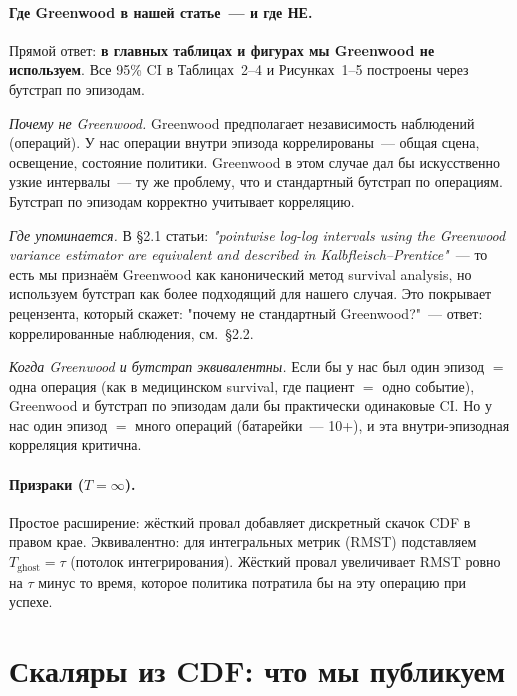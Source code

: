 \documentclass[11pt]{article}
\begin{document}
\paragraph{Где Greenwood в нашей статье~--- и где НЕ.} Прямой ответ: \textbf{в главных таблицах и фигурах мы Greenwood не используем}. Все 95\% CI в Таблицах~2--4 и Рисунках~1--5 построены через бутстрап по эпизодам.

\emph{Почему не Greenwood.} Greenwood предполагает независимость наблюдений (операций). У нас операции внутри эпизода коррелированы~--- общая сцена, освещение, состояние политики. Greenwood в этом случае дал бы искусственно узкие интервалы~--- ту же проблему, что и стандартный бутстрап по операциям. Бутстрап по эпизодам корректно учитывает корреляцию.

\emph{Где упоминается.} В \S2.1 статьи: \emph{"pointwise log-log intervals using the Greenwood variance estimator are equivalent and described in Kalbfleisch--Prentice"}~--- то есть мы признаём Greenwood как канонический метод survival analysis, но используем бутстрап как более подходящий для нашего случая. Это покрывает рецензента, который скажет: "почему не стандартный Greenwood?"~--- ответ: коррелированные наблюдения, см.\ \S2.2.

\emph{Когда Greenwood и бутстрап эквивалентны.} Если бы у нас был один эпизод $=$ одна операция (как в медицинском survival, где пациент $=$ одно событие), Greenwood и бутстрап по эпизодам дали бы практически одинаковые CI. Но у нас один эпизод $=$ много операций (батарейки~--- 10+), и эта внутри-эпизодная корреляция критична.

\paragraph{Призраки ($T=\infty$).} Простое расширение: жёсткий провал добавляет дискретный скачок CDF в правом крае. Эквивалентно: для интегральных метрик (RMST) подставляем $T_{\text{ghost}} = \tau$ (потолок интегрирования). Жёсткий провал увеличивает RMST ровно на $\tau$ минус то время, которое политика потратила бы на эту операцию при успехе.

\section{Скаляры из CDF: что мы публикуем}
\end{document}
